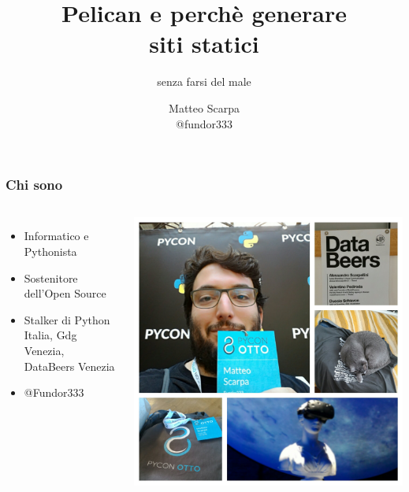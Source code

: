 
\title{Pelican e perchè generare\\ siti statici}
\subtitle{senza farsi del male}
\author{Matteo Scarpa \\ @fundor333}



\frame{\maketitle}

\begin{frame}
	\frametitle{Chi sono}
	\begin{columns}
		\begin{itemize}
			\item Informatico e Pythonista
			\item Sostenitore dell'Open Source
			\item Stalker di Python Italia, Gdg Venezia, DataBeers Venezia
			\item @Fundor333
		\end{itemize}
		\includegraphics[scale=0.08]{img/foto}
	\end{columns}
\end{frame}

